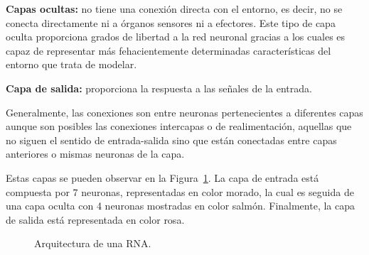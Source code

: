 \documentclass[
  us-letterpaper,
]{scrreprt}
\theoremstyle{plain}
\theoremstyle{definition}
\theoremstyle{definition}
\theoremstyle{remark}
\begin{document}
\textbf{Capas ocultas:} no tiene una conexión directa con el entorno, es
decir, no se conecta directamente ni a órganos sensores ni a efectores.
Este tipo de capa oculta proporciona grados de libertad a la red
neuronal gracias a los cuales es capaz de representar más
fehacientemente determinadas características del entorno que trata de
modelar.

\textbf{Capa de salida:} proporciona la respuesta a las señales de la
entrada.

Generalmente, las conexiones son entre neuronas pertenecientes a
diferentes capas aunque son posibles las conexiones intercapas o de
realimentación, aquellas que no siguen el sentido de entrada-salida sino
que están conectadas entre capas anteriores o mismas neuronas de la
capa.

Estas capas se pueden observar en la Figura~\ref{fig-RNA}. La capa de
entrada está compuesta por 7 neuronas, representadas en color morado, la
cual es seguida de una capa oculta con 4 neuronas mostradas en color
salmón. Finalmente, la capa de salida está representada en color rosa.

\begin{figure}


\caption{\label{fig-RNA}Arquitectura de una RNA.}

\end{figure}%
\end{document}
